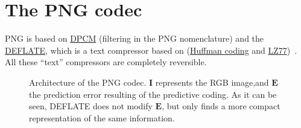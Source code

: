 \section{The PNG codec}

PNG is based on
\href{https://en.wikipedia.org/wiki/Differential_pulse-code_modulation}{DPCM}
(filtering in the PNG nomenclature) and the
\href{https://en.wikipedia.org/wiki/DEFLATE}{DEFLATE}, which is a text
compressor based on
(\href{https://en.wikipedia.org/wiki/Huffman_coding}{Huffman coding}
and
\href{https://en.wikipedia.org/wiki/LZ77_and_LZ78}{LZ77})~\cite{nelson96datacompression}. All
these ``text'' compressors are completely reversible.

\begin{figure}
  \centering
  \caption{Architecture of the PNG codec. ${\mathbf I}$ represents the
    RGB image,and ${\mathbf E}$ the prediction error resulting of the
    predictive coding. As it can be seen, DEFLATE does not modify
    ${\mathbf E}$, but only finds a more compact representation of the
    same information.}
\end{figure}


